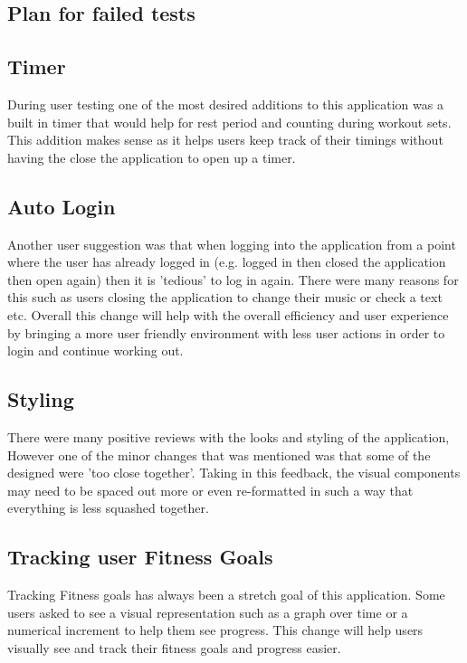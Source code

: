 \documentclass[12pt, titlepage]{article}
\begin{document}
\subsection{Plan for failed tests}

\subsection{Timer}
During user testing one of the most desired additions to this application was a built in timer that would help for rest period and counting during workout sets. This addition makes sense as it helps users keep track of their timings without having the close the application to open up a timer. 
\subsection{Auto Login}
Another user suggestion was that when logging into the application from a point where the user has already logged in (e.g. logged in then closed the application then open again) then it is 'tedious' to log in again. There were many reasons for this such as users closing the application to change their music or check a text etc. Overall this change will help with the overall efficiency and user experience by bringing a more user friendly environment with less user actions in order to login and continue working out.
\subsection{Styling}
There were many positive reviews with the looks and styling of the application, However one of the minor changes that was mentioned was that some of the designed were 'too close together'. Taking in this feedback, the visual components may need to be spaced out more or even re-formatted in such a way that everything is less squashed together.
\subsection{Tracking user Fitness Goals}
Tracking Fitness goals  has always been a stretch goal of this application. Some users asked to see a visual representation such as a graph over time or a numerical increment to help them see progress. This change will help users visually see and track their fitness goals and progress easier.
\end{document}
